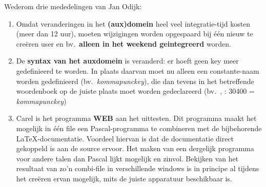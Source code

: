 Wederom drie mededelingen van Jan Odijk:
\begin{enumerate}
  \item Omdat veranderingen in het {\bf (aux)domein} heel veel integratie-tijd kosten 
(meer dan 12 uur), moeten wijzigingen worden opgespaard bij \'{e}\'{e}n nieuw te 
cre\"{e}ren user en bv.\ {\bf alleen in het weekend geintegreerd} worden.
  \item De {\bf syntax van het auxdomein} is veranderd: er hoeft geen key meer 
gedefi\-nieerd te worden. In plaats daarvan moet nu alleen een constante-naam 
worden gedefinieerd (bv.\ {\em kommapunckey\/}), die dan tevens in het 
betreffende woordenboek op de juiste plaats moet worden gedeclareerd (bv.\ , : 
30400 = {\em kommapunckey\/})
  \item Carel is het programma {\bf WEB} aan het uittesten. Dit programma maakt het 
mogelijk in \'{e}\'{e}n file een Pascal-programma te combineren met de 
bijbehorende \LaTeX-documentatie. Voordeel hiervan is dat de documentatie 
direct gekoppeld is aan de source ervoor. Het maken van een dergelijk programma 
voor andere talen dan 
Pascal lijkt mogelijk en zinvol. Bekijken van het resultaat van zo'n combi-file 
in verschillende windows is in principe al tijdens 
het cre\"{e}ren ervan mogelijk,
mits de juiste apparatuur beschikbaar is.
\end{enumerate}



